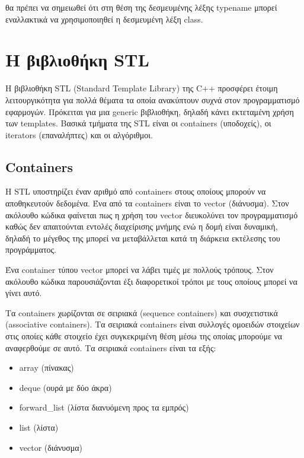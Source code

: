 



θα πρέπει να σημειωθεί ότι στη θέση της δεσμευμένης λέξης typename μπορεί εναλλακτικά να χρησιμοποιηθεί η δεσμευμένη λέξη class.

\section{Η βιβλιοθήκη STL}
Η βιβλιοθήκη STL (Standard Template Library) της C++ προσφέρει έτοιμη λειτουργικότητα για πολλά θέματα τα οποία ανακύπτουν συχνά στον προγραμματισμό εφαρμογών. Πρόκειται για μια generic βιβλιοθήκη, δηλαδή κάνει εκτεταμένη χρήση των templates. Βασικά τμήματα της STL είναι οι containers (υποδοχείς), οι iterators (επαναλήπτες) και οι αλγόριθμοι.

\subsection{Containers}
H STL υποστηρίζει έναν αριθμό από containers στους οποίους μπορούν να αποθηκευτούν δεδομένα. Ένα από τα containers είναι το vector (διάνυσμα). Στον ακόλουθο κώδικα φαίνεται πως η χρήση του vector διευκολύνει τον προγραμματισμό καθώς δεν απαιτούνται εντολές διαχείρισης μνήμης ενώ η δομή είναι δυναμική, δηλαδή το μέγεθος της μπορεί να μεταβάλλεται κατά τη διάρκεια εκτέλεσης του προγράμματος. 





Ένα container τύπου vector μπορεί να λάβει τιμές με πολλούς τρόπους. Στον ακόλουθο κώδικα παρουσιάζονται έξι διαφορετικοί τρόποι με τους οποίους μπορεί να γίνει αυτό.




Τα containers χωρίζονται σε σειριακά (sequence containers) και συσχετιστικά (associative containers). Τα σειριακά containers είναι συλλογές ομοειδών στοιχείων στις οποίες κάθε στοιχείο  έχει συγκεκριμένη θέση μέσω της οποίας μπορούμε να αναφερθούμε σε αυτό. Τα σειριακά containers είναι τα εξής: 
\begin{itemize}[noitemsep]
\item array (πίνακας) 
\item deque (ουρά με δύο άκρα)
\item forward\_list (λίστα διανυόμενη προς τα εμπρός)
\item list (λίστα)
\item vector (διάνυσμα)
\end{itemize}

